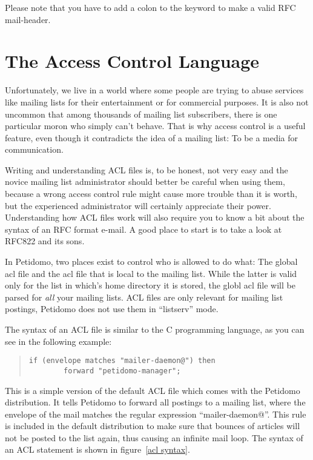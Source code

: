 \documentclass[a4paper,11pt]{scrreprt}
\begin{document}
Please note that you have to add a colon to the keyword to make a
valid RFC mail-header.


\section{The Access Control Language}
\label{acl}

Unfortunately, we live in a world where some people are trying to
abuse services like mailing lists for their entertainment or for
commercial purposes. It is also not uncommon that among thousands of
mailing list subscribers, there is one particular moron who simply
can't behave. That is why access control is a useful feature, even
though it contradicts the idea of a mailing list: To be a media for
communication.

Writing and understanding ACL files is, to be honest, not very easy
and the novice mailing list administrator should better be careful
when using them, because a wrong access control rule might cause more
trouble than it is worth, but the experienced administrator will
certainly appreciate their power. Understanding how ACL files work
will also require you to know a bit about the syntax of an RFC format
e-mail. A good place to start is to take a look at RFC822 and its
sons.

In Petidomo, two places exist to control who is allowed to do what:
The global acl file and the acl file that is local to the mailing
list. While the latter is valid only for the list in which's home
directory it is stored, the globl acl file will be parsed for
\emph{all} your mailing lists. ACL files are only relevant for mailing
list postings, Petidomo does not use them in ``listserv'' mode.

The syntax of an ACL file is similar to the C programming
language, as you can see in the following example:
\begin{quote}
\begin{verbatim}
if (envelope matches "mailer-daemon@") then
        forward "petidomo-manager";
\end{verbatim}
\end{quote}

This is a simple version of the default ACL file which comes with the
Petidomo distribution. It tells Petidomo to forward all postings to a
mailing list, where the envelope of the mail matches the regular
expression ``mailer-daemon@''. This rule is included in the default
distribution to make sure that bounces of articles will not be posted
to the list again, thus causing an infinite mail loop. The syntax of
an ACL statement is shown in figure~\ref{acl syntax}.
\end{document}
